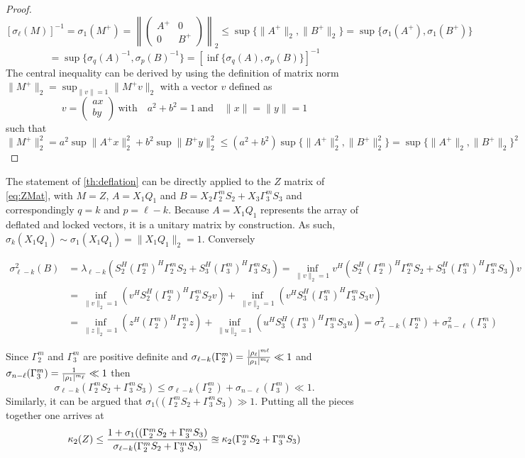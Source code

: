 \begin{proof}
\[
[\sigma_\ell(M)]^{-1} = \sigma_1(M^+) = \left\|\begin{pmatrix} A^+ & 0 \\ 0 & B^+ \end{pmatrix}\right\|_2 \leq \sup \{\|A^+\|_2, \|B^+\|_2\} = 
\sup \{\sigma_1(A^+), \sigma_1(B^+)\}
\]
\[
 = \sup \{\sigma_q(A)^{-1}, \sigma_p(B)^{-1}\} = \left[\inf \{\sigma_q(A), \sigma_p(B)\} \right]^{-1}
\]
The central inequality can be derived by using the definition of matrix norm $\|M^+\|_2 = \sup_{\|v\|=1}\|M^+ v\|_2$ with a vector $v$ defined as 
\[
v = \begin{pmatrix} a x \\ b y \end{pmatrix}\ \textrm{with}\quad a^2+b^2 = 1\ \textrm{and}\quad \|x\| = \|y\| = 1
\]
such that
\[
\|M^+\|^2_2 = a^2 \sup \|A^+ x\|^2_2 + b^2 \sup \|B^+ y\|^2_2 \leq (a^2+b^2) \sup \{\|A^+\|_2^2, \|B^+\|_2^2\} = \sup \{\|A^+\|_2, \|B^+\|_2\}^2  
\]
\end{proof}
The statement of \cref{th:deflation} can be directly applied to the $Z$ matrix of \eqref{eq:ZMat}, with $M=Z$, $A=X_1Q_1$ and $B = X_2 \Gamma_2^m S_2 + X_3 \Gamma_3^m S_3$ and correspondingly $q=k$ and $p=\ell-k$. Because $A=X_1Q_1$ represents the array of deflated and locked vectors, it is a unitary matrix by construction. As such, $\sigma_k(X_1Q_1) \sim \sigma_1(X_1Q_1) = \|X_1Q_1\|_2 = 1$. Conversely

\begin{eqnarray*}
\sigma^2_{\ell-k}(B) &= \lambda_{\ell-k}\left(S^H_2 (\Gamma_2^m)^H \Gamma_2^m S_2 + S^H_3 (\Gamma_3^m)^H \Gamma_3^m S_3\right) = \inf_{\|v\|_2=1} v^H \left(S^H_2 (\Gamma_2^m)^H \Gamma_2^m S_2 + S^H_3 (\Gamma_3^m)^H \Gamma_3^m S_3\right) v \\
 &= \inf_{\|v\|_2=1} (v^H S^H_2 (\Gamma_2^m)^H \Gamma_2^m S_2 v) + \inf_{\|v\|_2=1} (v^H S^H_3 (\Gamma_3^m)^H \Gamma_3^m S_3 v) \\
 &= \inf_{\|z\|_2=1} (z^H (\Gamma_2^m)^H \Gamma_2^m z) + \inf_{\|u\|_2=1} (u^H S^H_3 (\Gamma_3^m)^H \Gamma_3^m S_3 u) = \sigma^2_{\ell-k}(\Gamma^m_2) + \sigma^2_{n-\ell}(\Gamma^m_3)
\end{eqnarray*}


Since $\Gamma^m_2$ and $\Gamma^m_3$ are positive definite and $\sigma_{\ell-k}(\Gamma_2^m) = \frac{|\rho_{\ell}|^{m\ell}}{|\rho_{1}|^{m_\ell}} \ll 1$ and $\sigma_{n-\ell}(\Gamma_3^m) = \frac{1}{|\rho_{1}|^{m_\ell}} \ll 1$ then
\[
\sigma_{\ell-k}(\Gamma_2^m S_2 + \Gamma_3^m S_3) \leq \sigma_{\ell-k}(\Gamma^m_2) + \sigma_{n-\ell}(\Gamma^m_3) \ll 1.
\]
Similarly, it can be argued that $\sigma_1((\Gamma_2^m S_2 + \Gamma_3^m S_3) \gg 1$. Putting all the pieces together one arrives at
\[
\label{eq:condZ}
\mathop\mathrm{\kappa}_2\nolimits (Z) \leq \frac{1 + \sigma_1((\Gamma_2^m S_2 + \Gamma_3^m S_3)}{\sigma_{\ell-k}(\Gamma_2^m S_2 + \Gamma_3^m S_3)} \approxeq \mathop\mathrm{\kappa}_2\nolimits (\Gamma_2^m S_2 + \Gamma_3^m S_3)
\]

